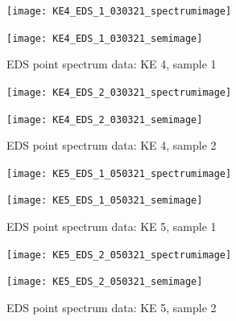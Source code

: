 \begin{figure}[H]
\centering
\begin{minipage}{.45\textwidth}
  \centering
  \texttt{[image: KE4\_EDS\_1\_030321\_spectrumimage]}
\end{minipage}
\begin{minipage}{.45\textwidth}
  \centering
  \texttt{[image: KE4\_EDS\_1\_030321\_semimage]}
\end{minipage}
\caption[EDS point spectrum data: KE 4, sample 1]{EDS point spectrum data: KE 4, sample 1}
\label{fig:ke4_point_eds_1}
\end{figure}

\begin{figure}[H]
\centering
\begin{minipage}{.45\textwidth}
  \centering
  \texttt{[image: KE4\_EDS\_2\_030321\_spectrumimage]}
\end{minipage}
\begin{minipage}{.45\textwidth}
  \centering
  \texttt{[image: KE4\_EDS\_2\_030321\_semimage]}
\end{minipage}
\caption[EDS point spectrum data: KE 4, sample 2]{EDS point spectrum data: KE 4, sample 2}
\label{fig:ke4_point_eds_2}
\end{figure}




\begin{figure}[H]
\centering
\begin{minipage}{.45\textwidth}
  \centering
  \texttt{[image: KE5\_EDS\_1\_050321\_spectrumimage]}
\end{minipage}
\begin{minipage}{.45\textwidth}
  \centering
  \texttt{[image: KE5\_EDS\_1\_050321\_semimage]}
\end{minipage}
\caption[EDS point spectrum data: KE 5, sample 1]{EDS point spectrum data: KE 5, sample 1}
\label{fig:ke5_point_eds_1}
\end{figure}

\begin{figure}[H]
\centering
\begin{minipage}{.45\textwidth}
  \centering
  \texttt{[image: KE5\_EDS\_2\_050321\_spectrumimage]}
\end{minipage}
\begin{minipage}{.45\textwidth}
  \centering
  \texttt{[image: KE5\_EDS\_2\_050321\_semimage]}
\end{minipage}
\caption[EDS point spectrum data: KE 5, sample 2]{EDS point spectrum data: KE 5, sample 2}
\label{fig:ke5_point_eds_2}
\end{figure}

